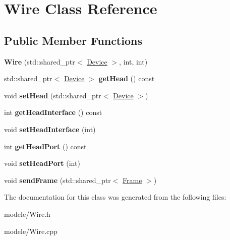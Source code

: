 \hypertarget{class_wire}{\section{Wire Class Reference}
\label{class_wire}
}
\subsection*{Public Member Functions}
\begin{DoxyCompactItemize}
\item 
\hypertarget{class_wire_a600dd9dc23060e4b43dfa4ee0680afab}{{\bfseries Wire} (std\-::shared\-\_\-ptr$<$ \hyperlink{class_device}{Device} $>$, int, int)}\label{class_wire_a600dd9dc23060e4b43dfa4ee0680afab}

\item 
\hypertarget{class_wire_a93a66ba9a4241640f5978e18d228d5d8}{std\-::shared\-\_\-ptr$<$ \hyperlink{class_device}{Device} $>$ {\bfseries get\-Head} () const }\label{class_wire_a93a66ba9a4241640f5978e18d228d5d8}

\item 
\hypertarget{class_wire_ae73e1187e61526c12fc51f82a0b0eac2}{void {\bfseries set\-Head} (std\-::shared\-\_\-ptr$<$ \hyperlink{class_device}{Device} $>$)}\label{class_wire_ae73e1187e61526c12fc51f82a0b0eac2}

\item 
\hypertarget{class_wire_a205b88f438a70bf432d1a81de1618074}{int {\bfseries get\-Head\-Interface} () const }\label{class_wire_a205b88f438a70bf432d1a81de1618074}

\item 
\hypertarget{class_wire_a8cbe457018f16aa64c209cf3fe7e8dc0}{void {\bfseries set\-Head\-Interface} (int)}\label{class_wire_a8cbe457018f16aa64c209cf3fe7e8dc0}

\item 
\hypertarget{class_wire_ab1cda6f5e6860bad324eba644934857e}{int {\bfseries get\-Head\-Port} () const }\label{class_wire_ab1cda6f5e6860bad324eba644934857e}

\item 
\hypertarget{class_wire_a48e0276e44271e2861899985a9bcb562}{void {\bfseries set\-Head\-Port} (int)}\label{class_wire_a48e0276e44271e2861899985a9bcb562}

\item 
\hypertarget{class_wire_a1dbb9883a056ee2f6f6f4d3b55860e66}{void {\bfseries send\-Frame} (std\-::shared\-\_\-ptr$<$ \hyperlink{class_frame}{Frame} $>$)}\label{class_wire_a1dbb9883a056ee2f6f6f4d3b55860e66}

\end{DoxyCompactItemize}


The documentation for this class was generated from the following files\-:\begin{DoxyCompactItemize}
\item 
modele/Wire.\-h\item 
modele/Wire.\-cpp\end{DoxyCompactItemize}
